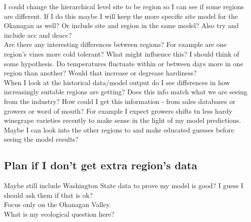 \documentclass[11pt,letter]{article}
\begin{document}
I could change the hierarchical level site to be region so I can see if some regions are different. If I do this maybe I will keep the more specific site model for the Okanagan as well? Or include site and region in the same model? Also try and include acc and deacc? \\

Are there any interesting differences between regions? For example are one region's vines more cold tolerant? What might influence this? I should think of some hypothesis. Do temperatures fluctuate within or between days more in one region than another? Would that increase or degrease hardiness?\\

When I look at the historical data/model output do I see differences in how increasingly suitable regions are getting?  Does this info match what we are seeing from the industry? How could I get this information - from sales databases or growers or word of mouth? For example I expect growers shifts tn less hardy winegrape varieties recently to make sense in the light of my model predictions. Maybe I can look into the other regions to and make educated guesses before seeing the model results?   \\

\subsection{Plan if I don't get extra region's data}

Maybe still include Washington State data to prove my model is good? I guess I should ask them if that is ok?\\

Focus only on the Okanagan Valley.\\

What is my ecological question here?\\
\end{document}
